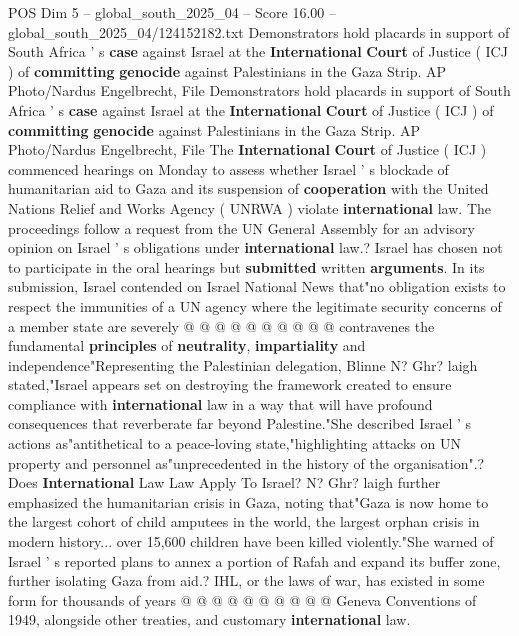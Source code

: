 \begin{textsample}{POS Dim 5 – global\_south\_2025\_04 – Score 16.00 – global\_south\_2025\_04/124152182.txt}  \label{ex:f5_pos_089}
Demonstrators hold placards in support of South Africa ' s \textbf{case} against Israel at the \textbf{International} \textbf{Court} of Justice ( ICJ ) of \textbf{committing} \textbf{genocide} against Palestinians in the Gaza Strip.
AP Photo/Nardus Engelbrecht, File Demonstrators hold placards in support of South Africa ' s \textbf{case} against Israel at the \textbf{International} \textbf{Court} of Justice ( ICJ ) of \textbf{committing} \textbf{genocide} against Palestinians in the Gaza Strip.
AP Photo/Nardus Engelbrecht, File The \textbf{International} \textbf{Court} of Justice ( ICJ ) commenced hearings on Monday to assess whether Israel ' s blockade of humanitarian aid to Gaza and its suspension of \textbf{cooperation} with the United Nations Relief and Works Agency ( UNRWA ) violate \textbf{international} law.
The proceedings follow a request from the UN General Assembly for an advisory opinion on Israel ' s obligations under \textbf{international} law.?
Israel has chosen not to participate in the oral hearings but \textbf{submitted} written \textbf{arguments}.
In its submission, Israel contended on Israel National News that"no obligation exists to respect the immunities of a UN agency where the legitimate security concerns of a member state are severely @ @ @ @ @ @ @ @ @ @ contravenes the fundamental \textbf{principles} of \textbf{neutrality}, \textbf{impartiality} and independence"Representing the Palestinian delegation, Blinne N?
Ghr? laigh stated,"Israel appears set on destroying the framework created to ensure compliance with \textbf{international} law in a way that will have profound consequences that reverberate far beyond Palestine."She described Israel ' s actions as"antithetical to a peace-loving state,"highlighting attacks on UN property and personnel as"unprecedented in the history of the organisation".?
Does \textbf{International} Law Law Apply To Israel?
N?
Ghr? laigh further emphasized the humanitarian crisis in Gaza, noting that"Gaza is now home to the largest cohort of child amputees in the world, the largest orphan crisis in modern history... over 15,600 children have been killed violently."She warned of Israel ' s reported plans to annex a portion of Rafah and expand its buffer zone, further isolating Gaza from aid.?
IHL, or the laws of war, has existed in some form for thousands of years @ @ @ @ @ @ @ @ @ @ Geneva Conventions of 1949, alongside other treaties, and customary \textbf{international} law.

\end{textsample}
